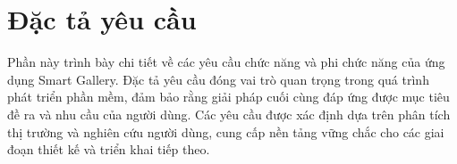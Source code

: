 \section{Đặc tả yêu cầu}

Phần này trình bày chi tiết về các yêu cầu chức năng và phi chức năng của ứng dụng Smart Gallery. Đặc tả yêu cầu đóng vai trò quan trọng trong quá trình phát triển phần mềm, đảm bảo rằng giải pháp cuối cùng đáp ứng được mục tiêu đề ra và nhu cầu của người dùng. Các yêu cầu được xác định dựa trên phân tích thị trường và nghiên cứu người dùng, cung cấp nền tảng vững chắc cho các giai đoạn thiết kế và triển khai tiếp theo.



